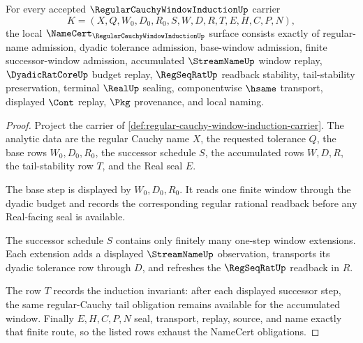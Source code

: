 \begin{theorem}
\label{thm:regular-cauchy-window-induction-namecert-obligations}
For every accepted $\RegularCauchyWindowInductionUp$ carrier
$$
K=(X,Q,W_0,D_0,R_0,S,W,D,R,T,E,H,C,P,N),
$$
the local $\NameCert_{\RegularCauchyWindowInductionUp}$ surface consists exactly of regular-name admission, dyadic tolerance admission, base-window admission, finite successor-window admission, accumulated $\StreamNameUp$ window replay, $\DyadicRatCoreUp$ budget replay, $\RegSeqRatUp$ readback stability, tail-stability preservation, terminal $\RealUp$ sealing, componentwise $\hsame$ transport, displayed $\Cont$ replay, $\Pkg$ provenance, and local naming.
\end{theorem}
\begin{proof}
Project the carrier of \autoref{def:regular-cauchy-window-induction-carrier}. The analytic data are the regular Cauchy name $X$, the requested tolerance $Q$, the base rows $W_0,D_0,R_0$, the successor schedule $S$, the accumulated rows $W,D,R$, the tail-stability row $T$, and the Real seal $E$.

The base step is displayed by $W_0,D_0,R_0$. It reads one finite window through the dyadic budget and records the corresponding regular rational readback before any Real-facing seal is available.

The successor schedule $S$ contains only finitely many one-step window extensions. Each extension adds a displayed $\StreamNameUp$ observation, transports its dyadic tolerance row through $D$, and refreshes the $\RegSeqRatUp$ readback in $R$.

The row $T$ records the induction invariant: after each displayed successor step, the same regular-Cauchy tail obligation remains available for the accumulated window. Finally $E,H,C,P,N$ seal, transport, replay, source, and name exactly that finite route, so the listed rows exhaust the NameCert obligations.
\end{proof}

